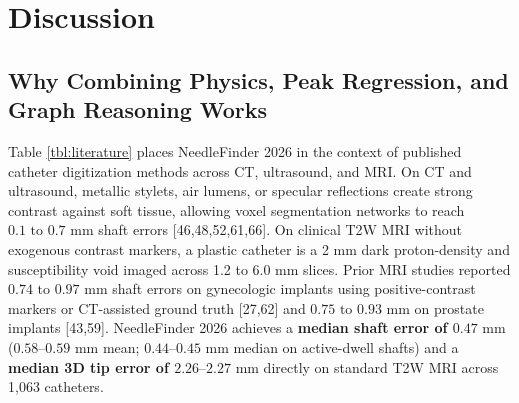 \documentclass[
  11pt,
]{article}
\begin{document}
\FloatBarrier

\section{Discussion}\label{discussion}



\subsection{Why Combining Physics, Peak Regression, and Graph Reasoning
Works}\label{why-combining-physics-peak-regression-and-graph-reasoning-works}

Table \ref{tbl:literature} places NeedleFinder 2026 in the context of
published catheter digitization methods across CT, ultrasound, and MRI.
On CT and ultrasound, metallic stylets, air lumens, or specular
reflections create strong contrast against soft tissue, allowing voxel
segmentation networks to reach \(0.1\text{ to }0.7\text{ mm}\) shaft
errors {[}46,48,52,61,66{]}. On clinical T2W MRI without exogenous
contrast markers, a plastic catheter is a 2 mm dark proton-density and
susceptibility void imaged across 1.2 to 6.0 mm slices. Prior MRI
studies reported \(0.74\text{ to }0.97\text{ mm}\) shaft errors on
gynecologic implants using positive-contrast markers or CT-assisted
ground truth {[}27,62{]} and \(0.75\text{ to }0.93\text{ mm}\) on
prostate implants {[}43,59{]}. NeedleFinder 2026 achieves a
\textbf{median shaft error of \(0.47\text{ mm}\)}
(\(0.58\text{--}0.59\text{ mm}\) mean; \(0.44\text{--}0.45\text{ mm}\)
median on active-dwell shafts) and a \textbf{median 3D tip error of
\(2.26\text{--}2.27\text{ mm}\)} directly on standard T2W MRI across
1,063 catheters.
\end{document}
